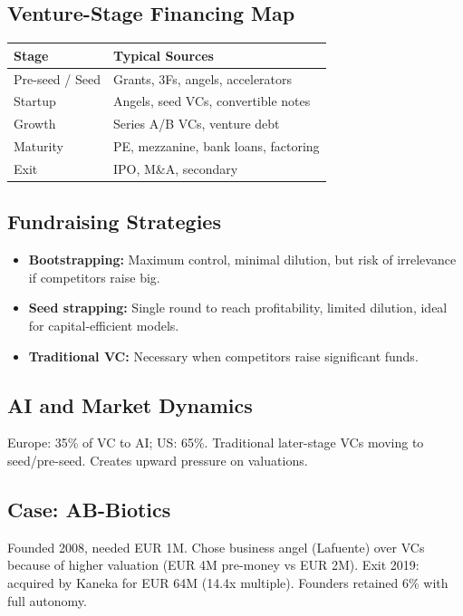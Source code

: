 \documentclass[a4paper,11pt]{article}
\begin{document}
\subsection{Venture-Stage Financing Map}

\begin{tabular}{@{}ll@{}}
\toprule
\textbf{Stage} & \textbf{Typical Sources} \\
\midrule
Pre-seed / Seed & Grants, 3Fs, angels, accelerators \\
Startup & Angels, seed VCs, convertible notes \\
Growth & Series A/B VCs, venture debt \\
Maturity & PE, mezzanine, bank loans, factoring \\
Exit & IPO, M\&A, secondary \\
\bottomrule
\end{tabular}

\subsection{Fundraising Strategies}

\begin{itemize}
\item \textbf{Bootstrapping:} Maximum control, minimal dilution, but risk of irrelevance if competitors raise big.
\item \textbf{Seed strapping:} Single round to reach profitability, limited dilution, ideal for capital-efficient models.
\item \textbf{Traditional VC:} Necessary when competitors raise significant funds.
\end{itemize}

\subsection{AI and Market Dynamics}

Europe: 35\% of VC to AI; US: 65\%. Traditional later-stage VCs moving to seed/pre-seed. Creates upward pressure on valuations.

\subsection{Case: AB-Biotics}

Founded 2008, needed EUR 1M. Chose business angel (Lafuente) over VCs because of higher valuation (EUR 4M pre-money vs EUR 2M). Exit 2019: acquired by Kaneka for EUR 64M (14.4x multiple). Founders retained 6\% with full autonomy.
\end{document}
